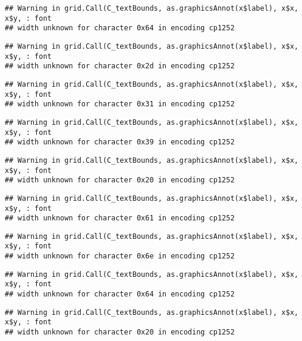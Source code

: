 \documentclass[
]{article}
\begin{document}
\begin{verbatim}
## Warning in grid.Call(C_textBounds, as.graphicsAnnot(x$label), x$x, x$y, : font
## width unknown for character 0x64 in encoding cp1252
\end{verbatim}

\begin{verbatim}
## Warning in grid.Call(C_textBounds, as.graphicsAnnot(x$label), x$x, x$y, : font
## width unknown for character 0x2d in encoding cp1252
\end{verbatim}

\begin{verbatim}
## Warning in grid.Call(C_textBounds, as.graphicsAnnot(x$label), x$x, x$y, : font
## width unknown for character 0x31 in encoding cp1252
\end{verbatim}

\begin{verbatim}
## Warning in grid.Call(C_textBounds, as.graphicsAnnot(x$label), x$x, x$y, : font
## width unknown for character 0x39 in encoding cp1252
\end{verbatim}

\begin{verbatim}
## Warning in grid.Call(C_textBounds, as.graphicsAnnot(x$label), x$x, x$y, : font
## width unknown for character 0x20 in encoding cp1252
\end{verbatim}

\begin{verbatim}
## Warning in grid.Call(C_textBounds, as.graphicsAnnot(x$label), x$x, x$y, : font
## width unknown for character 0x61 in encoding cp1252
\end{verbatim}

\begin{verbatim}
## Warning in grid.Call(C_textBounds, as.graphicsAnnot(x$label), x$x, x$y, : font
## width unknown for character 0x6e in encoding cp1252
\end{verbatim}

\begin{verbatim}
## Warning in grid.Call(C_textBounds, as.graphicsAnnot(x$label), x$x, x$y, : font
## width unknown for character 0x64 in encoding cp1252
\end{verbatim}

\begin{verbatim}
## Warning in grid.Call(C_textBounds, as.graphicsAnnot(x$label), x$x, x$y, : font
## width unknown for character 0x20 in encoding cp1252
\end{verbatim}
\end{document}
